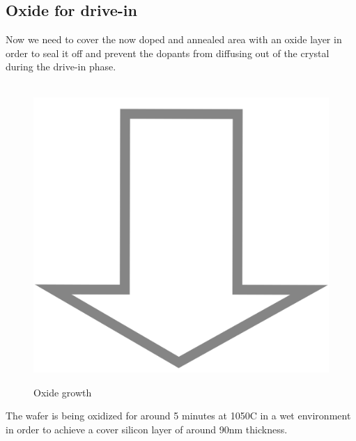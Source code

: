 \subsection{Oxide for drive-in}

Now we need to cover the now doped and annealed area with an oxide layer in order to seal it off and prevent the dopants from diffusing out of the crystal during the drive-in phase.

\begin{figure}[H]
	\centering
	\begin{tikzpicture}[node distance = 3cm, auto, thick,scale=\CrossSectionOnly, every node/.style={transform shape}]
		
	\end{tikzpicture} \\
	\includegraphics[scale=0.01]{down_arrow.png} \\
	\begin{tikzpicture}[node distance = 3cm, auto, thick,scale=\CrossSectionOnly, every node/.style={transform shape}]
		
	\end{tikzpicture}
	\caption{Oxide growth}
\end{figure}

The wafer is being oxidized for around 5 minutes at 1050\degree C in a wet environment in order to achieve a cover silicon layer of around 90nm thickness.

